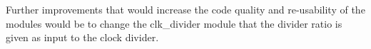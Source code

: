%
%
%
Further improvements that would increase the code quality and re-usability of the  modules would be to change the clk\_divider module that the divider ratio is given as input to the clock divider. 
